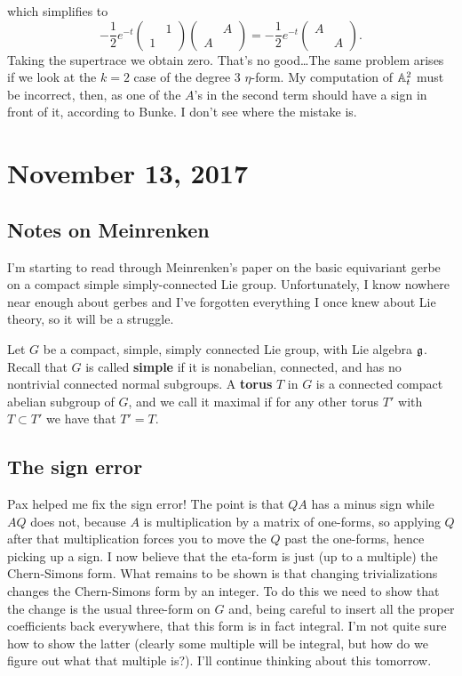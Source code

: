 \documentclass{amsart}
\begin{document}
which simplifies to
\begin{equation*}
    -\frac{1}{2}e^{-t}
    \begin{pmatrix}
        &1\\1&
    \end{pmatrix}
    \begin{pmatrix}
        &A\\A&
    \end{pmatrix}
    = -\frac{1}{2}e^{-t}
    \begin{pmatrix}
        A&\\&A
    \end{pmatrix}.
\end{equation*}
Taking the supertrace we obtain zero. That's no good\ldots The same problem
arises if we look at the $k=2$ case of the degree 3 $\eta$-form. My computation
of $\mathbb{A}_t^2$ must be incorrect, then, as one of the $A$'s in the second term
should have a sign in front of it, according to Bunke. I don't see where
the mistake is.

\section{November 13, 2017}

\subsection{Notes on Meinrenken}

I'm starting to read through Meinrenken's paper on the basic equivariant
gerbe on a compact simple simply-connected Lie group. Unfortunately, I know
nowhere near enough about gerbes and I've forgotten everything I once knew
about Lie theory, so it will be a struggle.

Let $G$ be a compact, simple, simply connected Lie group, with Lie algebra
$\mathfrak g$. Recall that $G$ is called \textbf{simple} if it is nonabelian,
connected, and has no nontrivial connected normal subgroups. A \textbf{torus}
$T$ in $G$ is a connected compact abelian subgroup of $G$, and we call it
maximal if for any other torus $T'$ with $T\subset T'$ we have that $T'=T$.

\subsection{The sign error}

Pax helped me fix the sign error! The point is that $QA$ has a minus sign
while $AQ$ does not, because $A$ is multiplication by a matrix of one-forms,
so applying $Q$ after that multiplication forces you to move the $Q$ past
the one-forms, hence picking up a sign. I now believe that the eta-form
is just (up to a multiple) the Chern-Simons form. What remains to be shown
is that changing trivializations changes the Chern-Simons form by an integer.
To do this we need to show that the change is the usual three-form on $G$
and, being careful to insert all the proper coefficients back everywhere,
that this form is in fact integral. I'm not quite sure how to show the latter
(clearly some multiple will be integral, but how do we figure out what that
multiple is?). I'll continue thinking about this tomorrow.
\end{document}
